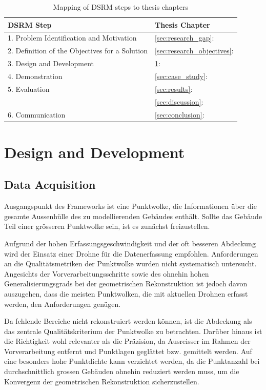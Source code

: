 \begin{table}[htbp]
    \centering
    \begin{tabular}{ll}
    \toprule
    \textbf{DSRM Step} & \textbf{Thesis Chapter} \\
    \midrule
    1. Problem Identification and Motivation & \ref{sec:research_gap}: \nameref{sec:research_gap} \\
    2. Definition of the Objectives for a Solution & \ref{sec:research_objectives}: \nameref{sec:research_objectives} \\
    3. Design and Development & \ref{sec:design_development}: \nameref{sec:design_development} \\
    4. Demonstration & \ref{sec:case_study}: \nameref{sec:case_study} \\
    5. Evaluation & \ref{sec:results}: \nameref{sec:results} \\
    & \ref{sec:discussion}: \nameref{sec:discussion} \\
    6. Communication & \ref{sec:conclusion}: \nameref{sec:conclusion} \\
    \bottomrule
    \end{tabular}
    \caption{Mapping of DSRM steps to thesis chapters}
    \label{tab:DSRM_steps}
\end{table}
 
\section{Design and Development}
\label{sec:design_development}




\subsection{Data Acquisition}
\begin{German}
Ausgangspunkt des Frameworks ist eine Punktwolke, die Informationen über die gesamte Aussenhülle des zu modellierenden Gebäudes enthält. Sollte das Gebäude Teil einer grösseren Punktwolke sein, ist es zunächst freizustellen.

Aufgrund der hohen Erfassungsgeschwindigkeit und der oft besseren Abdeckung wird der Einsatz einer Drohne für die Datenerfassung empfohlen. Anforderungen an die Qualitätsmetriken der Punktwolke wurden nicht systematisch untersucht. Angesichts der Vorverarbeitungsschritte sowie des ohnehin hohen Generalisierungsgrads bei der geometrischen Rekonstruktion ist jedoch davon auszugehen, dass die meisten Punktwolken, die mit aktuellen Drohnen erfasst werden, den Anforderungen genügen.

Da fehlende Bereiche nicht rekonstruiert werden können, ist die Abdeckung als das zentrale Qualitätskriterium der Punktwolke zu betrachten. Darüber hinaus ist die Richtigkeit wohl relevanter als die Präzision, da Ausreisser im Rahmen der Vorverarbeitung entfernt und Punktlagen geglättet bzw. gemittelt werden. Auf eine besonders hohe Punktdichte kann verzichtet werden, da die Punktanzahl bei durchschnittlich grossen Gebäuden ohnehin reduziert werden muss, um die Konvergenz der geometrischen Rekonstruktion sicherzustellen.
\end{German}

